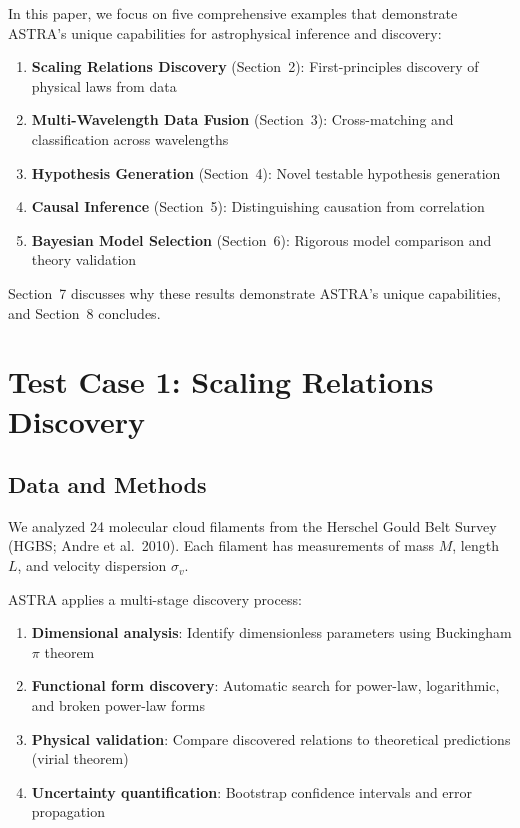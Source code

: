 \documentclass[usenatbib]{rasti}
\begin{document}
In this paper, we focus on five comprehensive examples that demonstrate ASTRA's unique capabilities for astrophysical inference and discovery:
\begin{enumerate}
\item \textbf{Scaling Relations Discovery} (Section~2): First-principles discovery of physical laws from data
\item \textbf{Multi-Wavelength Data Fusion} (Section~3): Cross-matching and classification across wavelengths
\item \textbf{Hypothesis Generation} (Section~4): Novel testable hypothesis generation
\item \textbf{Causal Inference} (Section~5): Distinguishing causation from correlation
\item \textbf{Bayesian Model Selection} (Section~6): Rigorous model comparison and theory validation
\end{enumerate}

Section~7 discusses why these results demonstrate ASTRA's unique capabilities, and Section~8 concludes.

\section{Test Case 1: Scaling Relations Discovery}

\subsection{Data and Methods}

We analyzed 24 molecular cloud filaments from the Herschel Gould Belt Survey (HGBS; Andre et al.~2010)\cite{andre2010}. Each filament has measurements of mass $M$, length $L$, and velocity dispersion $\sigma_v$.

ASTRA applies a multi-stage discovery process:
\begin{enumerate}
\item \textbf{Dimensional analysis}: Identify dimensionless parameters using Buckingham $\pi$ theorem
\item \textbf{Functional form discovery}: Automatic search for power-law, logarithmic, and broken power-law forms
\item \textbf{Physical validation}: Compare discovered relations to theoretical predictions (virial theorem)
\item \textbf{Uncertainty quantification}: Bootstrap confidence intervals and error propagation
\end{enumerate}
\end{document}
